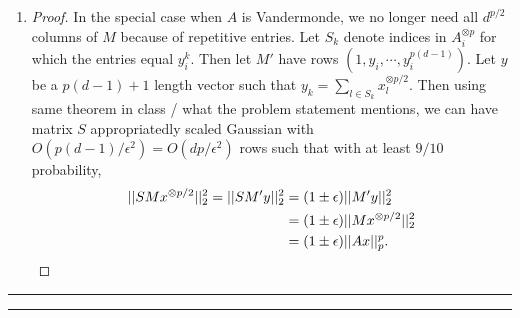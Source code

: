 \documentclass[11pt]{article}
\newcommand{\question}[1] {\vspace{.3in} \hrule\vspace{0.3em}
\noindent{\bf #1} \vspace{0.7em}
\hrule \vspace{.10in}}
\begin{document}
\begin{enumerate}[1.]
\begin{proof}
\begin{align*}
    &= (1 \pm \epsilon)||Ax||_p^p.
\end{align*}
Finally, to compute $SM$ we need only to perform $O(d^{p/2}/\epsilon^2)d^{p/2}$ dot products of vectors of length $n$, which takes in total $n \cdot \text{poly}(d)$ time.
\end{proof}
\item \begin{proof}
In the special case when $A$ is Vandermonde, we no longer need all $d^{p/2}$ columns of $M$ because of repetitive entries. Let $S_k$ denote indices in $A_i^{\otimes p}$ for which the entries equal $y_i^k$. Then let $M'$ have rows $(1, y_i, \cdots, y_i^{p(d-1)})$. Let $y$ be a $p(d-1)+1$ length vector such that $y_k = \sum_{l \in S_k} x_l^{\otimes p/2}$. Then using same theorem in class / what the problem statement mentions, we can have matrix $S$ appropriatedly scaled Gaussian with $O(p(d-1)/\epsilon^2) = O(dp/\epsilon^2)$ rows such that with at least $9/10$ probability,
\begin{align*}
    ||SMx^{\otimes p/2}||_2^2 = ||SM'y||_2^2 &= (1 \pm \epsilon)||M'y||_2^2\\
    &= (1 \pm \epsilon)||Mx^{\otimes p/2}||_2^2\\
    &= (1 \pm \epsilon)||Ax||_p^p. \qedhere
\end{align*}
\end{proof}
\end{enumerate}


\newpage
\question{Task 2}
\end{document}

